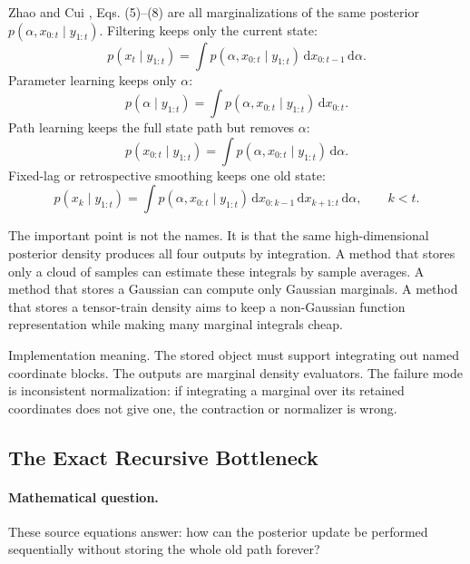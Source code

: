 \documentclass[11pt]{article}
\numberwithin{equation}{section}
\newcommand{\dd}{\,\mathrm d}
\begin{document}
Zhao and Cui \cite{zhao2024ttsequential}, Eqs. (5)--(8) are all marginalizations of the same posterior
\(p(\alpha,x_{0:t}\mid y_{1:t})\).  Filtering keeps only the current state:
\begin{equation}
    p(x_t\mid y_{1:t})
    =
    \int p(\alpha,x_{0:t}\mid y_{1:t})
    \dd x_{0:t-1}\dd\alpha .
    \label{eq:p24-bf-5}
\end{equation}
Parameter learning keeps only \(\alpha\):
\begin{equation}
    p(\alpha\mid y_{1:t})
    =
    \int p(\alpha,x_{0:t}\mid y_{1:t})\dd x_{0:t}.
    \label{eq:p24-bf-6}
\end{equation}
Path learning keeps the full state path but removes \(\alpha\):
\begin{equation}
    p(x_{0:t}\mid y_{1:t})
    =
    \int p(\alpha,x_{0:t}\mid y_{1:t})\dd\alpha .
    \label{eq:p24-bf-7}
\end{equation}
Fixed-lag or retrospective smoothing keeps one old state:
\begin{equation}
    p(x_k\mid y_{1:t})
    =
    \int p(\alpha,x_{0:t}\mid y_{1:t})
    \dd x_{0:k-1}\dd x_{k+1:t}\dd\alpha ,
    \qquad k<t .
    \label{eq:p24-bf-8}
\end{equation}

The important point is not the names.  It is that the same high-dimensional
posterior density produces all four outputs by integration.  A method that
stores only a cloud of samples can estimate these integrals by sample averages.
A method that stores a Gaussian can compute only Gaussian marginals.  A method
that stores a tensor-train density aims to keep a non-Gaussian function
representation while making many marginal integrals cheap.

Implementation meaning. The stored object must support
integrating out named coordinate blocks.  The outputs are marginal density
evaluators.  The failure mode is inconsistent normalization: if integrating a
marginal over its retained coordinates does not give one, the contraction or
normalizer is wrong.

\subsection{The Exact Recursive Bottleneck}

\paragraph{Mathematical question.}
These source equations answer: how can the posterior update be performed
sequentially without storing the whole old path forever?
\end{document}
